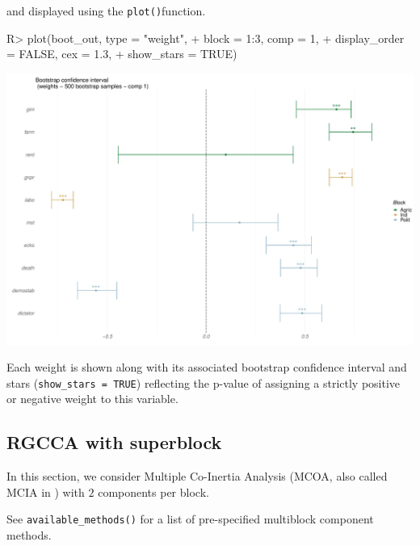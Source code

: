 \documentclass[
]{jss}
\begin{document}
\normalsize

and displayed using the \texttt{plot()}function.

\footnotesize

\begin{CodeChunk}
\begin{CodeInput}
R> plot(boot_out, type = "weight", 
+      block = 1:3, comp = 1, 
+      display_order = FALSE, cex = 1.3,
+      show_stars = TRUE)
\end{CodeInput}


\begin{center}\includegraphics{RGCCA_vignette_files/figure-latex/unnamed-chunk-14-1} \end{center}

\end{CodeChunk}

\normalsize

Each weight is shown along with its associated bootstrap confidence
interval and stars (\texttt{show\_stars\ =\ TRUE}) reflecting the
p-value of assigning a strictly positive or negative weight to this
variable.

\hypertarget{rgcca-with-superblock}{%
\subsection{RGCCA with superblock}\label{rgcca-with-superblock}}

In this section, we consider Multiple Co-Inertia Analysis
\citep{Chessel1996} (MCOA, also called MCIA in \citep{Cantini2021}) with
\(2\) components per block.

See \texttt{available\_methods()} for a list of pre-specified multiblock
component methods.
\end{document}

